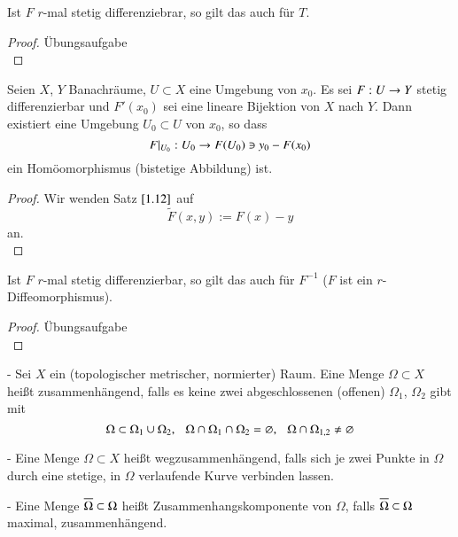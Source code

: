 \begin{remark}
    Ist $F$ $r$-mal stetig differenziebrar, so gilt das auch für $T$.
\end{remark}

\begin{proof}
    Übungsaufgabe \[ \]
\end{proof}

\begin{theorem}\label{1.13}
    Seien $X$, $Y$ Banachräume, $U\subset X$ eine Umgebung von $x_0$. Es sei $F:U\rightarrow Y$ stetig 
    differenzierbar und $F'(x_0)$ sei eine lineare Bijektion von $X$ nach $Y$.
    Dann existiert eine Umgebung $U_0\subset U$ von $x_0$, so dass
    \[
        F|_{U_0}: U_0\rightarrow F(U_0)\ni y_0 -F(x_0)
    \]
    ein Homöomorphismus (bistetige Abbildung) ist.
\end{theorem}

\begin{proof}
    Wir wenden Satz $\ref{1.12}$ auf
    \[
        \tilde F(x,y):= F(x)-y
    \]
    an.
    \[  \]
\end{proof}

\begin{remark}
    Ist $F$ $r$-mal stetig differenzierbar, so gilt das auch für $F^{-1}$ ($F$ ist ein 
    $r$-Diffeomorphismus).
\end{remark}

\begin{proof}
    Übungsaufgabe\[ \]
\end{proof}

\begin{defi}\label{1.14}
    \begin{description}
    \item{-}
    Sei $X$ ein (topologischer metrischer, normierter) Raum. Eine Menge $\Omega \subset X$ heißt
    zusammenhängend, falls es keine zwei abgeschlossenen (offenen) $\Omega_1$, $\Omega_2$ gibt
    mit
    \[
        \Omega\subset\Omega_1\cup\Omega_2, \hspace{.25cm} \Omega\cap \Omega_1 \cap \Omega_2 = \varnothing, \hspace{.25cm}
        \Omega\cap\Omega_{1,2}\neq \varnothing
    \]
    \item{-}
    Eine Menge $\Omega\subset X$ heißt wegzusammenhängend, falls sich je zwei Punkte in $\Omega$ durch
    eine stetige, in $\Omega$ verlaufende Kurve verbinden lassen.
    \item{-}
    Eine Menge $\overline\Omega \subset \Omega$ heißt Zusammenhangskomponente von $\Omega$, falls
    $\overline \Omega \subset \Omega$ maximal, zusammenhängend.
    \end{description}
\end{defi}


